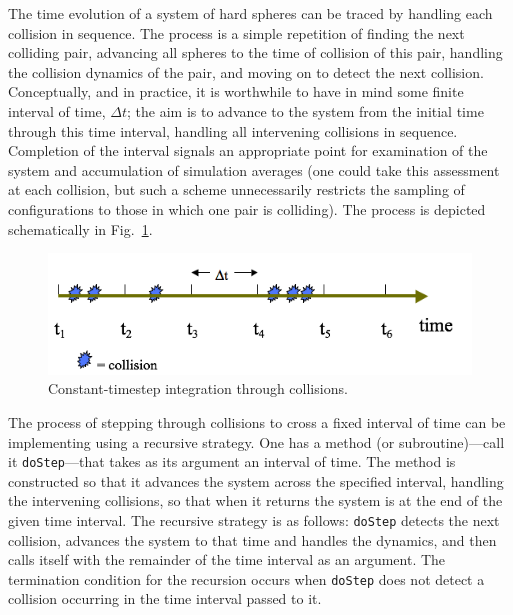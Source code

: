 \documentclass[]{article}
\begin{document}
The time evolution of a system of hard spheres can be traced by handling
each collision in sequence. The process is a simple repetition of
finding the next colliding pair, advancing all spheres to the time of
collision of this pair, handling the collision dynamics of the pair, and
moving on to detect the next collision. Conceptually, and in practice,
it is worthwhile to have in mind some finite interval of time, $\Delta t$; the
aim is to advance to the system from the initial time through this time
interval, handling all intervening collisions in sequence. Completion of
the interval signals an appropriate point for examination of the system
and accumulation of simulation averages (one could take this assessment at
each collision, but such a scheme unnecessarily restricts the sampling
of configurations to those in which one pair is colliding). The process
is depicted schematically in Fig.~\ref{fig:integration}.

\begin{figure}
  \centering
  \includegraphics[width=\textwidth]{HSMD_figures/image037}
  \caption{\label{fig:integration}Constant-timestep integration through collisions.}
\end{figure}

The process of stepping through collisions to cross a fixed interval of
time can be implementing using a recursive strategy. One has a method
(or subroutine)---call it \texttt{doStep}---that takes as its argument an
interval of time. The method is constructed so that it advances the
system across the specified interval, handling the intervening
collisions, so that when it returns the system is at the end of the
given time interval. The recursive strategy is as follows: \texttt{doStep}
detects the next collision, advances the system to that time and handles
the dynamics, and then calls itself with the remainder of the time
interval as an argument. The termination condition for the recursion
occurs when \texttt{doStep} does not detect a collision occurring in the time
interval passed to it.

\end{document}
